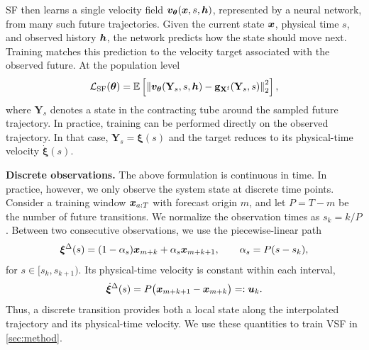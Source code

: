 SF then learns a single velocity field
${\bm{v}}_{{\bm{\theta}}}({\bm{x}},s,{\bm{h}})$, represented by a neural network, from many such
future trajectories. Given the current state ${\bm{x}}$, physical time $s$, and
observed history ${\bm{h}}$, the network predicts how the state should move next.
Training matches this prediction to the velocity target associated with the
observed future. At the population level
\begin{equation}
    \mathcal L_{\mathrm{SF}}({\bm{\theta}})
    =
    \mathbb E
    \left[
        \left\lVert
            {\bm{v}}_{{\bm{\theta}}}(\mathbf{Y}_s,s,{\bm{h}})
            -
            \mathbf{g}_{\mathbf{X}^{\mathrm{f}}}(\mathbf{Y}_s,s)
        \right\rVert_2^2
    \right],
    \label{eq:continuous_sf_objective}
\end{equation}
where $\mathbf{Y}_s$ denotes a state in the contracting tube around the
sampled future trajectory. In practice, training can be performed directly
on the observed trajectory. In that case,
$\mathbf{Y}_s=\boldsymbol{\xi}(s)$ and the target reduces to its
physical-time velocity $\dot{\boldsymbol{\xi}}(s)$.


\textbf{Discrete observations.}
The above formulation is continuous in time. In practice, however, we only observe the system state at discrete time points. Consider a training window ${\bm{x}}_{a:T}$ with forecast origin $m$, and let
$P=T-m$ be the number of future transitions. We normalize the observation
times as $s_k=k/P$.
%
Between two consecutive observations, we use the piecewise-linear path
\begin{equation}
    \boldsymbol{\xi}^{\Delta}(s)
    =
    (1-\alpha_s){\bm{x}}_{m+k}
    +
    \alpha_s{\bm{x}}_{m+k+1},
    \qquad
    \alpha_s=P(s-s_k),
    \label{eq:physical_time_interpolation}
\end{equation}
for $s\in[s_k,s_{k+1})$. Its physical-time velocity is constant within each
interval,
\begin{equation}
    \dot{\boldsymbol{\xi}}^{\Delta}(s)
    =
    P
    \bigl(
        {\bm{x}}_{m+k+1}-{\bm{x}}_{m+k}
    \bigr)
    =:
    {\bm{u}}_k.
    \label{eq:physical_time_velocity}
\end{equation}
Thus, a discrete transition provides both a local state along the interpolated
trajectory and its physical-time velocity. We use these quantities to train
VSF in \cref{sec:method}.




